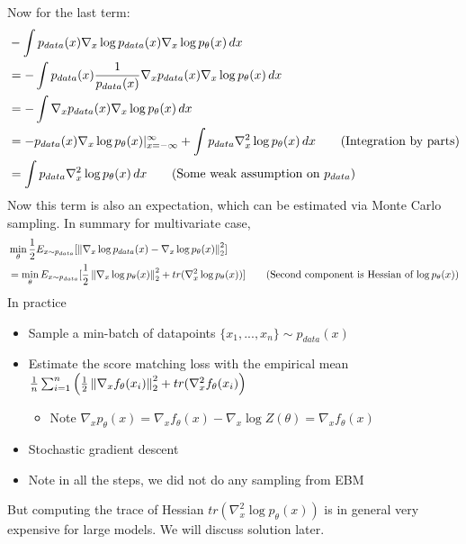 Now for the last term: 
    \begin{align*}
        & - \int p_{data}(x)\nabla_x \log p_{data}(x) \nabla_x \log p_\theta(x) \,dx\\
        & = - \int p_{data}(x) \frac{1}{p_{data}(x)} \nabla_x p_{data}(x) \nabla_x \log p_\theta(x) \,dx \\
        & = - \int \nabla_x p_{data}(x) \nabla_x \log p_\theta(x) \,dx \\
        & = -p_{data}(x) \nabla_x \log p_\theta(x)|_{x=-\infty}^\infty + \int p_{data}\nabla_x^2\log p_\theta(x) \, dx \tag{Integration by parts} \\
        & =\int p_{data}\nabla_x^2\log p_\theta(x) \, dx \tag{Some weak assumption on $p_{data}$} \\
    \end{align*}
Now this term is also an expectation, which can be estimated via Monte Carlo sampling. In summary for multivariate case, 
    \begin{align*}
        & \min_\theta \frac{1}{2} E_{x\sim p_{data}}[\left\lVert\nabla_x \log p_{data}(x) - \nabla_x \log p_\theta(x)\right\rVert_2^2]\\
        & = \min_\theta E_{x\sim p_{data}}[\frac{1}{2} \left\lVert\nabla_x \log p_\theta(x)\right\rVert_2^2 + tr(\nabla_x^2 \log p_\theta(x))] \tag{Second component is Hessian of $\log p_\theta(x)$}
    \end{align*}
In practice 
    \begin{itemize}
        \item Sample a min-batch of datapoints $\{ x_1, ..., x_n \} \sim p_{data}(x)$
        \item Estimate the score matching loss with the empirical mean $\frac{1}{n} \sum_{i=1}^{n}\left(\frac{1}{2}\left\lVert\nabla_x f_\theta(x_i)\right\rVert_2^2 + tr(\nabla_x^2 f_\theta(x_i) \right)$
            \begin{itemize}
                \item Note $\nabla_x p_\theta(x) = \nabla_x f_\theta(x) - \nabla_x \log Z(\theta) = \nabla_x f_\theta(x)$
            \end{itemize}
        \item Stochastic gradient descent
        \item Note in all the steps, we did not do any sampling from EBM
    \end{itemize}
But computing the trace of Hessian $tr(\nabla_x^2 \log p_\theta(x))$ is in general very expensive for large models. We will discuss solution later. 


